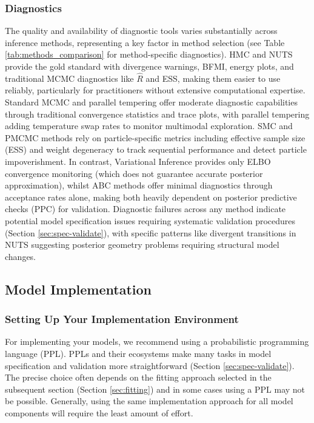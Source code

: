 \documentclass{article}
\begin{document}
\subsubsection{Diagnostics}

The quality and availability of diagnostic tools varies substantially across inference methods, representing a key factor in method selection (see Table \ref{tab:methods_comparison} for method-specific diagnostics).
HMC and NUTS provide the gold standard with divergence warnings, BFMI, energy plots, and traditional MCMC diagnostics like $\hat{R}$ and ESS, making them easier to use reliably, particularly for practitioners without extensive computational expertise.
Standard MCMC and parallel tempering offer moderate diagnostic capabilities through traditional convergence statistics and trace plots, with parallel tempering adding temperature swap rates to monitor multimodal exploration.
SMC and PMCMC methods rely on particle-specific metrics including effective sample size (ESS) and weight degeneracy to track sequential performance and detect particle impoverishment. 
In contrast, Variational Inference provides only ELBO convergence monitoring (which does not guarantee accurate posterior approximation), whilst ABC methods offer minimal diagnostics through acceptance rates alone, making both heavily dependent on posterior predictive checks (PPC) for validation.
Diagnostic failures across any method indicate potential model specification issues requiring systematic validation procedures (Section \ref{sec:spec-validate}), with specific patterns like divergent transitions in NUTS suggesting posterior geometry problems requiring structural model changes.

\subsection{Model Implementation}\label{sec:implementation}

\subsubsection{Setting Up Your Implementation Environment}

For implementing your models, we recommend using a probabilistic programming language (PPL).
PPLs and their ecosystems make many tasks in model specification and validation more straightforward (Section \ref{sec:spec-validate}).
The precise choice often depends on the fitting approach selected in the subsequent section (Section \ref{sec:fitting}) and in some cases using a PPL may not be possible.
Generally, using the same implementation approach for all model components will require the least amount of effort.
\end{document}
